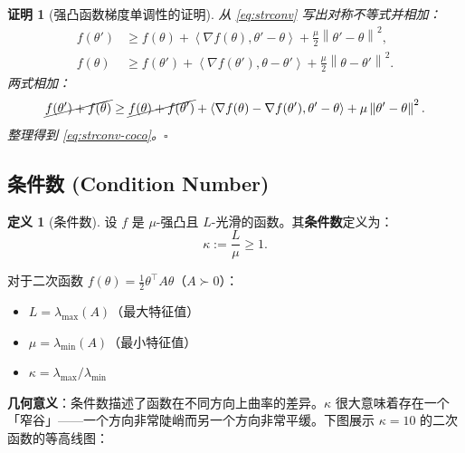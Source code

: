 \documentclass[12pt,a4paper]{ctexart}
\theoremstyle{definition}
\newtheorem{definition}{定义}[section]
\theoremstyle{plain}
\newtheorem*{proof*}{证明}
\newcommand{\grad}{\nabla}
\newcommand{\norm}[1]{\left\lVert #1 \right\rVert}
\newcommand{\ip}[2]{\left\langle #1,#2 \right\rangle}
\begin{document}
\begin{proof*}[强凸函数梯度单调性的证明]
  从 \eqref{eq:strconv} 写出对称不等式并相加：
  \begin{align*}
    f(\theta') &\ge f(\theta) + \ip{\grad f(\theta)}{\theta' - \theta} + \frac{\mu}{2}\norm{\theta' - \theta}^2, \\
    f(\theta) &\ge f(\theta') + \ip{\grad f(\theta')}{\theta - \theta'} + \frac{\mu}{2}\norm{\theta - \theta'}^2.
  \end{align*}
  两式相加：
  \begin{equation}
    \cancel{f(\theta') + f(\theta)} \ge \cancel{f(\theta) + f(\theta')}
    + \ip{\grad f(\theta) - \grad f(\theta')}{\theta' - \theta} + \mu\norm{\theta' - \theta}^2.
  \end{equation}
  整理得到 \eqref{eq:strconv-coco}。$\square$
\end{proof*}

\subsection{条件数 (Condition Number)}

\begin{definition}[条件数]
  设 $f$ 是 $\mu$-强凸且 $L$-光滑的函数。其\textbf{条件数}定义为：
  \begin{equation}\label{eq:condition}
    \kappa := \frac{L}{\mu} \ge 1.
  \end{equation}
\end{definition}

对于二次函数 $f(\theta) = \frac12 \theta^\top A \theta$（$A \succ 0$）：
\begin{itemize}
  \item $L = \lambda_{\max}(A)$（最大特征值）
  \item $\mu = \lambda_{\min}(A)$（最小特征值）
  \item $\kappa = \lambda_{\max} / \lambda_{\min}$
\end{itemize}

\textbf{几何意义}：条件数描述了函数在不同方向上曲率的差异。$\kappa$ 很大意味着存在一个「窄谷」——一个方向非常陡峭而另一个方向非常平缓。下图展示 $\kappa=10$ 的二次函数的等高线图：

\begin{center}
\end{center}
\end{document}
